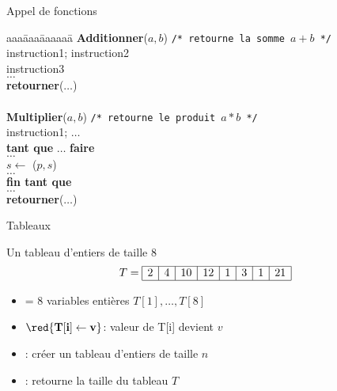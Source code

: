\begin{frame}{Appel de fonctions}
    \begin{tabbing}
    aaa\=aaa\=aaaaaa\=\kill
    \textbf{Additionner}($a,b$) \texttt{/* retourne la somme $a+b$ */} \\
    \> instruction1; instruction2 \\
    \> instruction3 \\
    \> $\ldots$ \\
    \> \textbf{retourner}($\ldots$) \\~\\
    \textbf{Multiplier}($a,b$) \texttt{/* retourne le produit $a*b$ */} \\
    \> instruction1;  $\ldots$ \\
    \> \textbf{tant que} $\ldots$ \textbf{faire} \\
    \>\>  $\ldots$ \\
    \>\>  $s\leftarrow$ ($p,s$) \\
    \>\>  $\ldots$ \\
    \> \textbf{fin tant que} \\
    \> $\ldots$ \\
    \> \textbf{retourner}($\ldots$)
  \end{tabbing}
\end{frame}

\begin{frame}{Tableaux}
  
Un tableau d'entiers de taille 8 
$$T =  \begin{array}{|c|c|c|c|c|c|c|c|}
    \hline
     2 & 4 & 10 & 12 & 1 & 3 & 1 & 21 \\
    \hline
  \end{array}$$
  \begin{itemize}
  \item<2->[] = 8 variables entières $T[1], \ldots, T[8]$ 
  \item<3-> ${\red{\mathbf{T[i] \leftarrow v}}}$: valeur de T[i] devient $v$ 
  \item<4-> {} : créer un tableau d'entiers de taille $n$
  \item<5-> {} : retourne la taille du tableau $T$
  \end{itemize}
\end{frame}

